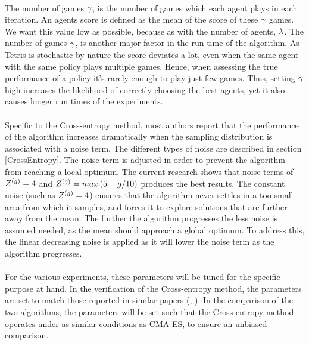 \\
The number of games $\gamma$, 
is the number of games  which each agent 
plays in each iteration. An agents score is defined as the 
mean of the score of these 
$\gamma$ games.
We want this value low as possible, because as with the number of
agents, $\lambda$. The number of games $\gamma$, 
is another major factor in the run-time of the algorithm.
As Tetris is stochastic by nature the score deviates a lot, 
even when the
same agent with the same policy plays multiple games. 
Hence, when assessing the true
performance of a policy it's rarely enough to play just few games. Thus, setting 
$\gamma$ high increases the likelihood of correctly choosing the best 
agents, yet it also causes longer run times of the experiments.\\
\\
Specific to the Cross-entropy method, 
most authors report that the performance of the 
algorithm increases dramatically when the sampling 
distribution is associated with
a noise term. The different types of 
noise are described in section \ref{CrossEntropy}.
The noise term is adjusted in order to 
prevent the algorithm from reaching a local optimum.
The current research shows that noise terms of $Z^{(g)} = 4$ and 
$Z^{(g)} = max \left( 5 - g / 10 \right)$ 
\citep{thiery:09} produces the best results.
The constant noise (such as $Z^{(g)} = 4$) ensures that the algorithm
never settles in a too small area from which it samples, and forces it to explore
solutions that are further away from the mean. The further the 
algorithm progresses 
the less noise is assumed needed, as the mean should approach a global optimum. To
address this, the linear decreasing noise 
is applied as it will lower the noise term
as the algorithm progresses.\\
\\
For the various experiments, these 
parameters will be tuned for the specific purpose 
at hand. In the verification of the Cross-entropy method, the parameters are set 
to match those reported in similar papers (\cite{thiery:09}, \cite{szita:06}).
In the comparison of the two algorithms, the parameters will be set such that 
the Cross-entropy method operates under as 
similar conditions as CMA-ES, to ensure an unbiased
comparison.





